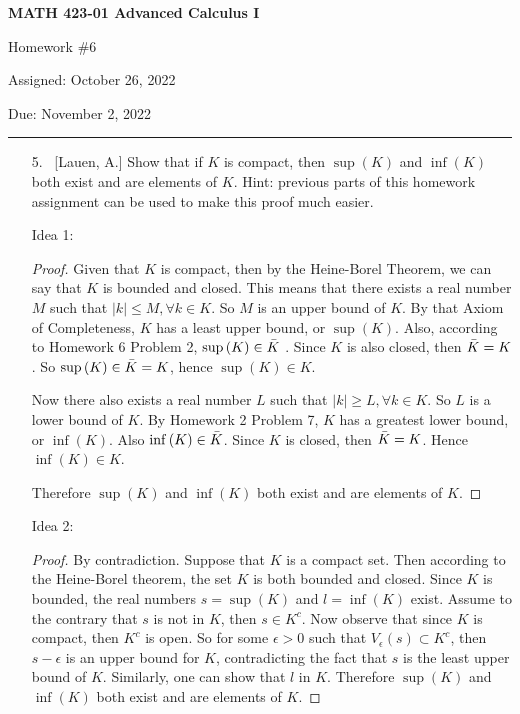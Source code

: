 \documentclass[10pt]{article}
\theoremstyle{definition}
\begin{document}
\pagestyle{empty}  %

\begin{center}  %

{\bf MATH 423-01  Advanced Calculus I

Homework \#6

Assigned: October 26, 2022

Due: November 2, 2022}

\end{center}

\medskip

\hrule   %

\bigskip


\begin{enumerate}

\item[5.]  ~[Lauen, A.] Show that if $K$ is compact, then $\sup{(K)}$ and $\inf{(K)}$ both exist and are elements of $K$.  Hint: previous parts of this homework assignment can be used to make this proof much easier.

\par \medskip

Idea 1:
\begin{proof}	
      Given that $K$ is compact, then by the Heine-Borel Theorem, we can say that $K$ is bounded and closed.  This means that there exists a real number $M$ such that $|k|\leq M, \forall k \in K$.  So $M$ is an upper bound of $K$.  By that Axiom of Completeness, $K$ has a least upper bound, or $\sup{(K)}$.  Also, according to Homework 6 Problem 2, $\sup{(K)} \in \Bar{K}$ .  Since $K$ is also closed, then $\Bar{K}=K$.  So $\sup{(K)} \in \Bar{K}=K$, hence $\sup{(K)} \in K$.  

      Now there also exists a real number $L$ such that $|k|\geq L, \forall k \in K$.  So $L$ is a lower bound of $K$.  By Homework 2 Problem 7, $K$ has a greatest lower bound, or $\inf{(K)}$.  Also $\inf{(K)} \in \Bar{K}$.  Since $K$ is closed, then $\Bar{K}=K$.  Hence $\inf{(K)} \in K$.

      Therefore $\sup{(K)}$ and $\inf{(K)}$ both exist and are elements of $K$.
 \end{proof}

\par \medskip

 Idea 2:
 \begin{proof}
 By contradiction.  Suppose that $K$ is a compact set.  Then according to the Heine-Borel theorem, the set $K$ is both bounded and closed.  Since $K$ is bounded, the real numbers $s=\sup{(K)}$ and $l =\inf{(K)}$ exist.  Assume to the contrary that $s$ is not in $K$, then $s \in K^c$.  Now observe that since $K$ is compact, then $K^c$ is open.  So for some $\epsilon > 0$ such that $V_{\epsilon}(s) \subset K^c$, then $s-\epsilon$ is an upper bound for $K$, contradicting the fact that $s$ is the least upper bound of $K$.  Similarly, one can show that $l$ in $K$.  Therefore $\sup{(K)}$ and $\inf{(K)}$ both exist and are elements of $K$.
 \end{proof}


\end{enumerate}
\end{document}
